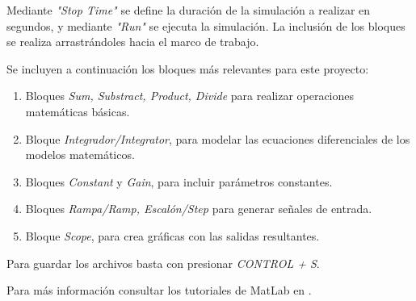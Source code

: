 Mediante \textit{"Stop Time"} se define la duración de la simulación a realizar en segundos, y mediante \textit{"Run"} se ejecuta la simulación. La inclusión de los bloques se realiza arrastrándoles hacia el marco de trabajo.

Se incluyen a continuación los bloques más relevantes para este proyecto:
\begin{enumerate}
    \item Bloques \textit{Sum, Substract, Product, Divide} para realizar operaciones matemáticas básicas.
     \item Bloque \textit{Integrador/Integrator}, para modelar las ecuaciones diferenciales de los modelos matemáticos.
     \item Bloques\textit{ Constant} y \textit{Gain}, para incluir parámetros constantes.
     \item Bloques \textit{Rampa/Ramp, Escalón/Step} para generar señales de entrada.
     \item Bloque\textit{ Scope}, para crea gráficas con las salidas resultantes.
\end{enumerate}

Para guardar los archivos basta con presionar \textit{CONTROL + S}.

Para más información consultar los tutoriales de MatLab en \cite{matlab_intro}.